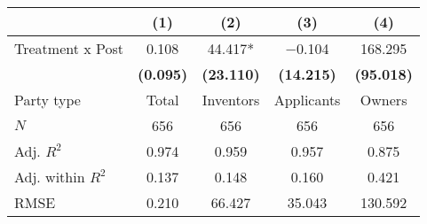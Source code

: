 
\begin{tabular}[t]{lcccc}
\toprule
  & (1) & (2) & (3) & (4)\\
\midrule
Treatment x Post & \num{0.108} & \num{44.417}* & \num{-0.104} & \num{168.295}\\
\textbf{} & \textbf{(\num{0.095})} & \textbf{(\num{23.110})} & \textbf{(\num{14.215})} & \textbf{(\num{95.018})}\\
\midrule
Party type & Total & Inventors & Applicants & Owners\\
$N$ & \num{656} & \num{656} & \num{656} & \num{656}\\
Adj. $R^2$ & \num{0.974} & \num{0.959} & \num{0.957} & \num{0.875}\\
Adj. within $R^2$ & \num{0.137} & \num{0.148} & \num{0.160} & \num{0.421}\\
RMSE & \num{0.210} & \num{66.427} & \num{35.043} & \num{130.592}\\
\bottomrule
\end{tabular}
